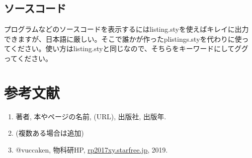 \documentclass[11pt,b5paper,papersize,dvipdfmx]{jsbook}
\begin{document}
%
\subsection{ソースコード}
プログラムなどのソースコードを表示するにはlisting.styを使えばキレイに出力できますが、日本語に厳しい。そこで誰かが作ったplistings.styを代わりに使ってください。使い方はlisting.styと同じなので、そちらをキーワードにしてググってください。

%
\section*{参考文献}
\renewcommand{\labelenumi}{[\arabic{enumi}]} %
\begin{enumerate}
\item 著者, 本やページの名前, (URL), 出版社, 出版年.
\item (複数ある場合は追加)
\item @vuccaken, 物科研HP, \url{rp2017xy.starfree.jp}, 2019.
\end{enumerate}
\renewcommand{\labelenumi}{\arabic{enumi}.} %
\end{document}
